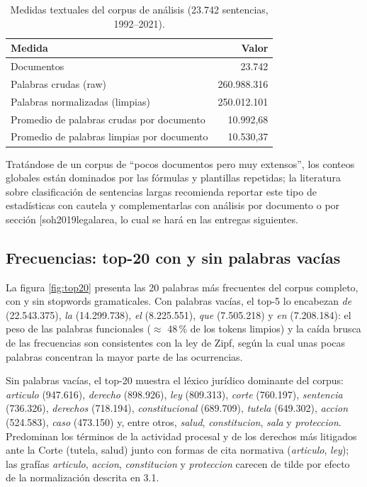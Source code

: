 \documentclass[11pt]{tg_usta}
\makeatletter
\renewcommand{\cite}{\@ifnextchar[{\@tempswatrue\@citex}{\@tempswafalse\@citex[]}}
\makeatother
\begin{document}
\begin{table}[ht]
    \centering
    \caption{Medidas textuales del corpus de análisis (23.742 sentencias, 1992--2021).}
    \label{tab:medidas}
    \begin{tabular}{lr}
        \toprule
        \textbf{Medida} & \textbf{Valor} \\
        \midrule
        Documentos & 23.742 \\
        Palabras crudas (raw) & 260.988.316 \\
        Palabras normalizadas (limpias) & 250.012.101 \\
        Promedio de palabras crudas por documento & 10.992,68 \\
        Promedio de palabras limpias por documento & 10.530,37 \\
        \bottomrule
    \end{tabular}
\end{table}

Tratándose de un corpus de ``pocos documentos pero muy extensos'', los conteos globales están dominados por las fórmulas y plantillas repetidas; la literatura sobre clasificación de sentencias largas recomienda reportar este tipo de estadísticas con cautela y complementarlas con análisis por documento o por sección \cite{soh2019legalarea}, lo cual se hará en las entregas siguientes.

\subsection{Frecuencias: top-20 con y sin palabras vacías}
La figura \ref{fig:top20} presenta las 20 palabras más frecuentes del corpus completo, con y sin stopwords gramaticales. Con palabras vacías, el top-5 lo encabezan \emph{de} (22.543.375), \emph{la} (14.299.738), \emph{el} (8.225.551), \emph{que} (7.505.218) y \emph{en} (7.208.184): el peso de las palabras funcionales ($\approx$ 48\,\% de los tokens limpios) y la caída brusca de las frecuencias son consistentes con la ley de Zipf, según la cual unas pocas palabras concentran la mayor parte de las ocurrencias.

Sin palabras vacías, el top-20 muestra el léxico jurídico dominante del corpus: \emph{articulo} (947.616), \emph{derecho} (898.926), \emph{ley} (809.313), \emph{corte} (760.197), \emph{sentencia} (736.326), \emph{derechos} (718.194), \emph{constitucional} (689.709), \emph{tutela} (649.302), \emph{accion} (524.583), \emph{caso} (473.150) y, entre otros, \emph{salud}, \emph{constitucion}, \emph{sala} y \emph{proteccion}. Predominan los términos de la actividad procesal y de los derechos más litigados ante la Corte (tutela, salud) junto con formas de cita normativa (\emph{articulo}, \emph{ley}); las grafías \emph{articulo}, \emph{accion}, \emph{constitucion} y \emph{proteccion} carecen de tilde por efecto de la normalización descrita en 3.1.
\end{document}
